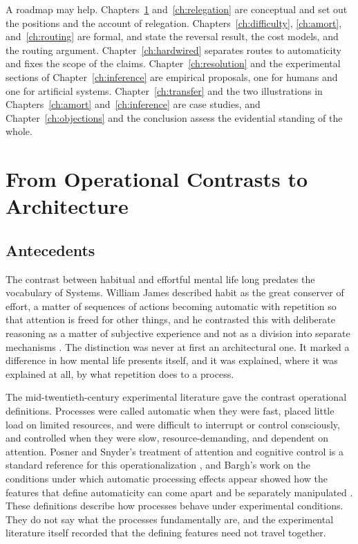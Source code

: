\documentclass[11pt]{report}
\theoremstyle{remark}
\theoremstyle{definition}
\begin{document}
A roadmap may help. Chapters~\ref{ch:history} and~\ref{ch:relegation} are conceptual and set out the positions and the account of relegation. Chapters~\ref{ch:difficulty}, \ref{ch:amort}, and~\ref{ch:routing} are formal, and state the reversal result, the cost models, and the routing argument. Chapter~\ref{ch:hardwired} separates routes to automaticity and fixes the scope of the claims. Chapter~\ref{ch:resolution} and the experimental sections of Chapter~\ref{ch:inference} are empirical proposals, one for humans and one for artificial systems. Chapter~\ref{ch:transfer} and the two illustrations in Chapters~\ref{ch:amort} and~\ref{ch:inference} are case studies, and Chapter~\ref{ch:objections} and the conclusion assess the evidential standing of the whole.

\chapter{From Operational Contrasts to Architecture}\label{ch:history}

\section{Antecedents}

The contrast between habitual and effortful mental life long predates the vocabulary of Systems. William James described habit as the great conserver of effort, a matter of sequences of actions becoming automatic with repetition so that attention is freed for other things, and he contrasted this with deliberate reasoning as a matter of subjective experience and not as a division into separate mechanisms \cite{james1890}. The distinction was never at first an architectural one. It marked a difference in how mental life presents itself, and it was explained, where it was explained at all, by what repetition does to a process.

The mid-twentieth-century experimental literature gave the contrast operational definitions. Processes were called automatic when they were fast, placed little load on limited resources, and were difficult to interrupt or control consciously, and controlled when they were slow, resource-demanding, and dependent on attention. Posner and Snyder's treatment of attention and cognitive control is a standard reference for this operationalization \cite{posner1975}, and Bargh's work on the conditions under which automatic processing effects appear showed how the features that define automaticity can come apart and be separately manipulated \cite{bargh1992}. These definitions describe how processes behave under experimental conditions. They do not say what the processes fundamentally are, and the experimental literature itself recorded that the defining features need not travel together.
\end{document}

